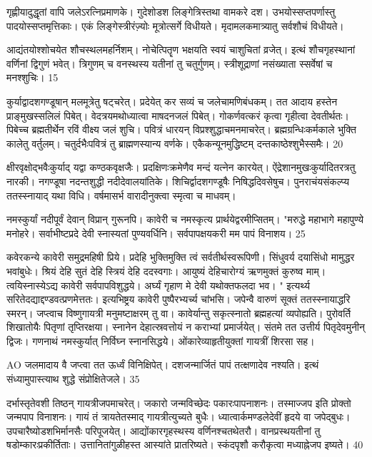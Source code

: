 गृह्णीयादुद्धृतां वापि जलेऽरत्निप्रमाणके।
गुदेशोडश लिङ्गेत्रिस्तथा वामकरे दश।
उभयोस्सप्तपर्णास्तु पादयोस्सप्तमृत्तिकाः।
एकं लिङ्गेस्त्रीरंज़्योः मूत्रोत्सर्गे विधीयते।
मृदामलकमात्र्यातु सर्वशौचं विधीयते।

आद्यंतयोश्शोचयेत शौचस्थलमहर्निशम्।
नोचेत्पितॄण भक्षयति स्वयं चाशुचितां व्रजेत्।
इत्थं शौचगृहस्थानां वर्णिनां द्विगुणं भवेत्।
त्रिगुणम् च वनस्थस्य यतीनां तु चतुर्गुणम्।
स्त्रीशूद्राणां नसंख्याता स्सर्वेषां च मनश्शुचिः।
15

कुर्याद्वादशगण्डूषान् मलमूत्रेतु षट्चरेत्।
प्रदेयेत् कर सव्यं च जलेचामणिबंधकम्।
तत आदाय हस्तेन प्राङ्मुखस्सलिलं पिबेत्।
वेदत्रयमथोध्यात्वा माषदनजलं पिबेत्।
गोकर्णवत्करं कृत्वा गृहीत्वा देवतीर्थतः।
पिबेच्च ब्रह्मतीर्थेन रविं वीक्ष्य जलं शुचि।
पवित्रं धारयन् विप्रश्शुद्धाचमनमाचरेत्।
ब्रह्मग्रन्धिःकर्मकाले भुक्ति कालेतु वर्तुलम्।
चतुर्दभैःपवित्रं तु ब्राह्मणस्यान्य वर्णके।
एकैकन्यूनमुद्धिष्टम् दन्तकाष्ठेश्शुभैस्समैः।
20

क्षीरवृक्षोद्भवैःकुर्याद् यद्वा कण्ठकवृक्षजैः।
प्रदक्षिणःक्रमेणैव मन्दं यत्नेन कारयेत्।
ऐंद्रेशानमुखःकुर्यादितरत्रतु नारकी।
नगण्डूषा नदन्तशुद्धी नदीदेवालयांतिके।
शिचिर्द्वादशगण्डूषैः निषिद्धदिवसेषुच।
पुनराचंयसंकल्प्य ततस्स्नायाद् यथा विधि।
वर्षमासर्भ वारादीनुक्त्वा स्मृत्वा च माधवम्।

नमस्कुर्यां नदीपूर्वं देवान् विप्रान् गुरूनपि।
कावेरी च नमस्कृत्य प्रार्थयेद्वरमीप्सितम्।
"मरुद्धे महाभागे महापुण्ये मनोहरे।
सर्वाभीष्टप्रदे देवी स्नास्यतां पुण्यवर्धिनि।
सर्वपापक्षयकरी मम पापं विनाशय।
25

कवेरकन्ये कावेरी समुद्रमहिषी प्रिये।
प्रदेहि भुक्तिमुक्ति त्वं सर्वतीर्थस्वरूपिणी।
सिंधुवर्य दयासिंधो मामुद्धर भवांबुधेः।
श्रियं देहि सुतं देहि स्त्रियं देहि ददस्वगाः।
आयुष्यं देहिचारोग्यं ऋणमुक्तं कुरुष्व माम्।
त्वयिस्नास्येऽद्य कावेरी सर्वपापविशुद्धये।
अर्घ्यं गृहाण मे देवी यथोक्तफलदा भव।
" इत्यर्थ्य सरितेदद्याद्दण्डवत्प्रणमेत्ततः।
इत्यभिष्ट्रय कावेरी पुष्पैरभ्यर्च्य चांभसि।
जपेन्वै वारुणं सूक्तं ततस्स्नायाद्धरि स्मरन्।
जप्त्वाच विष्णुगायत्री मनुमष्टाक्षरम् तु वा।
कावेर्यान्तु सकृत्स्नातो ब्रह्महत्यां व्यपोह्यति।
पुरोवर्ति शिखातोयैः पितृणां तृप्तिरक्षया।
स्नानेन देहात्स्रवत्तोयं न कराभ्यां प्रमार्जयेत्।
संतमे तत उत्तीर्य पितृदेवमुनीन् द्विजः।
गणनाथं नमस्कुर्यात् निर्विघ्न स्नानसिद्धये।
ओंकारेव्याहृतीयुक्तां गायत्रीं शिरसा सह।

AO
जलमादाय वै जप्त्वा तत ऊर्ध्वं विनिक्षिपेत्।
दशजन्मार्जितं पापं तत्क्षणादेव नश्यति।
इत्थं संध्यामुपास्त्याथ शुद्धे संप्रोक्षितेजले।
35

दर्भास्तृतेवशी तिष्ठन् गायत्रीजपमाचरेत्।
जकारो जन्मविच्छेदः पकारःपापनाशनः।
तस्माज्जप इति प्रोक्तो जन्मपाप विनाशनः।
गायं तं त्रायतेतस्माद् गायत्रीत्युच्यते बुधैः।
ध्यात्वार्कमण्डलेदेवीं हृदये वा जपेद्बुधः।
उपचारैष्योडशभिर्मानसैः परिपूजयेत्।
आद्योंकारगृहस्थस्य वर्णिनश्चतथेतरौ।
वानप्रस्थयतीनां तु षडोम्कारःप्रकीर्तिताः।
उत्तानितांगुळीहस्त आस्यांते प्रातरिष्यते।
स्कंदपृशौ करौकृत्वा मध्याह्नेजप इष्यते।
40

